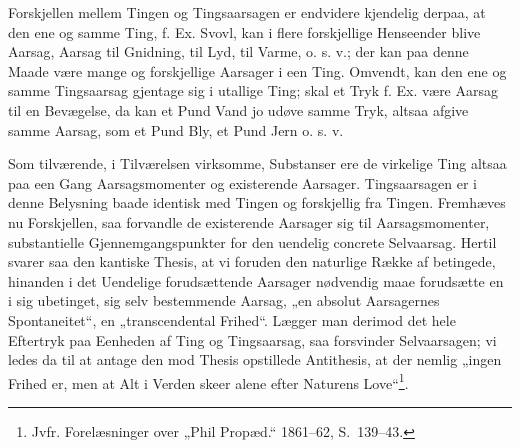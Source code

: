 \documentclass[11pt]{book}
\newcommand{\opage}[1]{\marginnote{\footnotesize\textit{[#1]}}}
\begin{document}
Forskjellen mellem Tingen og Tingsaarsagen er endvidere kjendelig
derpaa, at den ene og samme Ting, f. Ex. Svovl, kan i flere forskjellige
Henseender blive Aarsag, Aarsag til Gnidning, til Lyd, til Varme, o. s.
v.; der kan paa denne Maade være mange og forskjellige Aarsager i een
Ting. Omvendt, kan den ene og samme Tingsaarsag gjentage sig i
\opage{121} \setcounter{footnote}{0}%
utallige Ting; skal et Tryk f. Ex. være Aarsag til en Bevægelse, da kan
et Pund Vand jo udøve samme Tryk, altsaa afgive samme Aarsag, som et Pund
Bly, et Pund Jern o. s. v.

Som tilværende, i Tilværelsen virksomme, Substanser ere de virkelige Ting
altsaa paa een Gang Aarsagsmomenter og existerende Aarsager.
Tingsaarsagen er i denne Belysning baade identisk med Tingen og
forskjellig fra Tingen. Fremhæves nu Forskjellen, saa forvandle de
existerende Aarsager sig til Aarsagsmomenter, substantielle
Gjennemgangspunkter for den uendelig concrete Selvaarsag. Hertil svarer
saa den kantiske Thesis, at vi foruden den naturlige Række af betingede,
hinanden i det Uendelige forudsættende Aarsager nødvendig maae
forudsætte en i sig ubetinget, sig selv bestemmende Aarsag, „en absolut
Aarsagernes Spontaneitet“, en „transcendental Frihed“. Lægger man derimod
det hele Eftertryk paa Eenheden af Ting og Tingsaarsag, saa forsvinder
Selvaarsagen; vi ledes da til at antage den mod Thesis opstillede
Antithesis, at der nemlig „ingen Frihed er, men at Alt i Verden skeer
alene efter Naturens Love“\footnote{Jvfr. Forelæsninger over „Phil
Propæd.“ 1861--62, S.\ 139--43.}.
\end{document}
